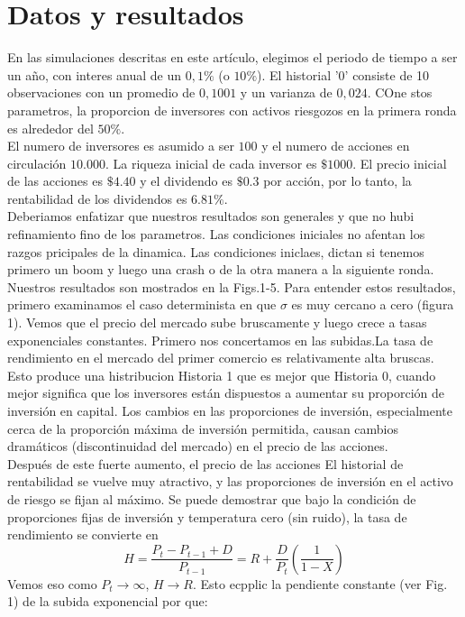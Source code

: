 \documentclass[12pt,a4paper]{article}
\begin{document}
\section{Datos y resultados}
\quad En las simulaciones descritas en este artículo, elegimos el periodo de tiempo a ser un año, con interes anual de un $0,1\%$ (o $10\%$). El historial '0' consiste de 10 observaciones con un promedio de $0,1001$ y un varianza de $0,024$. COne stos parametros, la proporcion de inversores con activos riesgozos en la primera ronda es alrededor del $50\%$.\\
\quad El numero de inversores es asumido a ser $100$ y el numero de acciones en circulación $10.000$. La riqueza inicial de cada inversor es $\$ 1000$. El precio inicial de las acciones es $\$4.40$ y el dividendo es $\$ 0.3$ por acción, por lo tanto, la rentabilidad de los dividendos es $6.81\%$.\\
\quad Deberiamos enfatizar que nuestros resultados son generales y que no hubi refinamiento fino de los parametros. Las condiciones iniciales no afentan los razgos pricipales de la dinamica. Las condiciones iniclaes, dictan si tenemos primero un boom y luego una crash o de la otra manera a la siguiente ronda.\\
\quad Nuestros resultados son mostrados en la Figs.1-5. Para entender estos resultados, primero examinamos el caso determinista en que $\sigma$ es muy cercano a cero (figura 1). Vemos que el precio del mercado sube bruscamente y luego crece a tasas  exponenciales constantes. Primero nos concertamos en las subidas.La tasa de rendimiento en el mercado del primer comercio es relativamente alta bruscas. Esto produce una histribucion Historia 1 que es mejor que Historia 0, cuando mejor significa que los inversores están dispuestos a aumentar su proporción de inversión en capital. Los cambios en las proporciones de inversión, especialmente cerca de la proporción máxima de inversión permitida, causan cambios dramáticos (discontinuidad del mercado) en el precio de las acciones.\\
\quad Después de este fuerte aumento, el precio de las acciones El historial de rentabilidad se vuelve muy atractivo, y las proporciones de inversión en el activo de riesgo se fijan al máximo. Se puede demostrar que bajo la condición de proporciones fijas de inversión y temperatura cero (sin ruido), la tasa de rendimiento se convierte en
$$
H=\frac{P_t-P_{t-1}+D}{P_{t-1}}=R+\frac{D}{P_t}\left(\frac{1}{1-X}\right)
$$
\quad Vemos eso como $P_t\rightarrow \infty$, $H\rightarrow R$. Esto ecpplic la pendiente constante (ver Fig. 1) de la subida exponencial por que:
\end{document}
